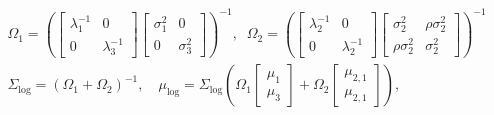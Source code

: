 \begin{gather}
  \Omega_{1} = \left(
    \begin{bmatrix}
      \lambda_{1}^{-1} & 0 \\
      0 & \lambda_{3}^{-1}
    \end{bmatrix}
    \begin{bmatrix}
      \sigma_{1}^{2} & 0 \\
      0 & \sigma_{3}^{2}
    \end{bmatrix}
  \right)^{-1},
  \;\;
  \Omega_{2} = \left(
    \begin{bmatrix}
      \lambda_{2}^{-1} & 0 \\
      0 & \lambda_{2}^{-1}
    \end{bmatrix}
    \begin{bmatrix}
      \sigma_{2}^{2} & \rho\sigma_{2}^{2} \\
      \rho\sigma_{2}^{2} & \sigma_{2}^{2}
    \end{bmatrix}
  \right)^{-1} \label{eqn:log-pooling-gaussian-one} \\
  \Sigma_{\text{log}} = 
  \left(\Omega_{1} + \Omega_{2}\right)^{-1}, \quad
  \mu_{\text{log}} = 
  \Sigma_{\text{log}} 
  \left(
    \Omega_{1}
    \begin{bmatrix}
      \mu_{1} \\
      \mu_{3}
    \end{bmatrix}
    +
    \Omega_{2}
    \begin{bmatrix}
      \mu_{2, 1} \\
      \mu_{2, 1}
    \end{bmatrix}
  \right),
  \label{eqn:log-pooling-gaussian-two}
\end{gather}